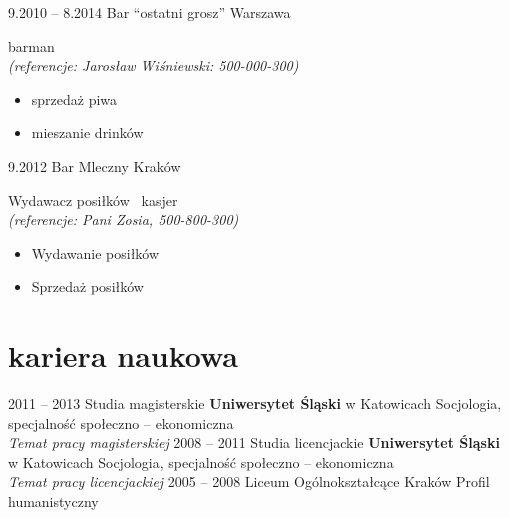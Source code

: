 \documentclass[]{konserw-cv} %
\begin{document}
\begin{entrylist}
\entry
{9.2010 -- 8.2014}
{Bar ``ostatni grosz''}
{Warszawa}
{
barman \\
\emph{(referencje: Jarosław Wiśniewski: 500-000-300)}
\begin{itemize}
\item sprzedaż piwa
\item mieszanie drinków
\end{itemize}
}
\entry
{9.2012}
{Bar Mleczny}
{Kraków}
{
Wydawacz posiłków \ kasjer \\
\emph{(referencje: Pani Zosia, 500-800-300)}
\begin{itemize}
\item Wydawanie posiłków
\item Sprzedaż posiłków
\end{itemize}
}
\end{entrylist}



\section{kariera naukowa}

\begin{entrylist}
\entry
{2011 -- 2013}
{Studia magisterskie}
{{\bfseries Uniwersytet Śląski} w Katowicach}
{Socjologia, specjalność społeczno -- ekonomiczna \\
\emph{Temat pracy magisterskiej }
}
\entry
{2008 -- 2011}
{Studia licencjackie}
{{\bfseries Uniwersytet Śląski} w Katowicach}
{Socjologia, specjalność społeczno -- ekonomiczna \\
\emph{Temat pracy licencjackiej }
}
\entry
{2005 -- 2008}
{Liceum Ogólnokształcące}
{Kraków}
{Profil humanistyczny}
\end{entrylist}

\end{document}
